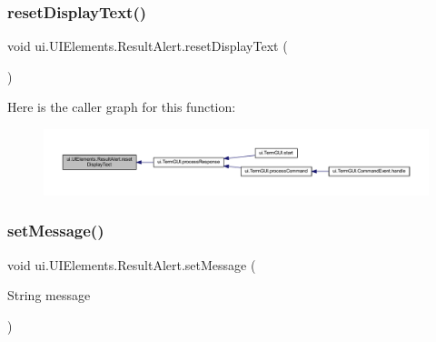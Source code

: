 \subsubsection{\texorpdfstring{reset\+Display\+Text()}{resetDisplayText()}}
{\footnotesize\ttfamily void ui.\+U\+I\+Elements.\+Result\+Alert.\+reset\+Display\+Text (\begin{DoxyParamCaption}{ }\end{DoxyParamCaption})\hspace{0.3cm}{\ttfamily [inline]}}

Here is the caller graph for this function\+:
\nopagebreak
\begin{figure}[H]
\begin{center}
\leavevmode
\includegraphics[width=350pt]{classui_1_1_u_i_elements_1_1_result_alert_ac15ce87d85f7eb1b88aa3ae6f8d6b8e9_icgraph}
\end{center}
\end{figure}
\mbox{\label{classui_1_1_u_i_elements_1_1_result_alert_a540b3c6bfce9a590488f1b32c23cf1f5}} 
\subsubsection{\texorpdfstring{set\+Message()}{setMessage()}\hspace{0.1cm}{\footnotesize\ttfamily [1/2]}}
{\footnotesize\ttfamily void ui.\+U\+I\+Elements.\+Result\+Alert.\+set\+Message (\begin{DoxyParamCaption}\item[{String}]{message }\end{DoxyParamCaption})\hspace{0.3cm}{\ttfamily [inline]}}

